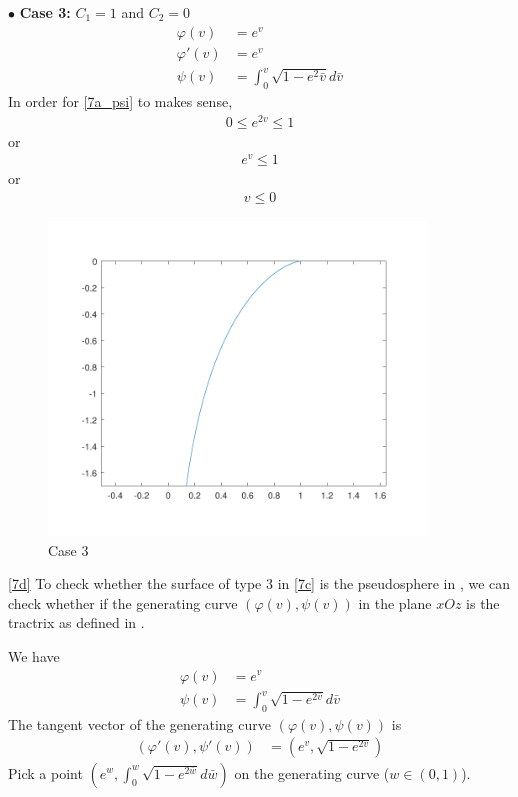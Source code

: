 \documentclass[a4paper]{report}
\begin{document}
$\bullet$ \textbf{Case 3:} $C_1 = 1$ and $C_2 = 0$
\begin{align}
\varphi(v) &= e^{v} \label{7c_phi_c3}\\
\varphi'(v) &= e^{v}\\
\psi(v) &= \int_{0}^{v} \sqrt{1 - e^{2} \bar{v}}d\bar{v}
\end{align}
In order for \eqref{7a_psi} to makes sense,
\begin{align}
0 \leq e^{2v} \leq 1
\end{align}
or
\begin{align}
e^{v} \leq 1
\end{align}
or
\begin{align}
v \leq 0
\end{align}

\begin{figure}[H]
	\centering	\includegraphics[width=10cm]{7c_3}
	\caption{Case 3}
\end{figure}
\newpage
\ref{7d} To check whether the surface of type 3 in \ref{7c} is the pseudosphere in , we can check whether if the generating curve $(\varphi(v), \psi(v))$ in the plane $xOz$ is the tractrix as defined in .

We have
\begin{align}
	\varphi(v) &= e^{v}\\
	\psi(v) &= \int_{0}^{v} \sqrt{1 - e^{2\bar{v} }}d\bar{v} 
\end{align}
The tangent vector of the generating curve $(\varphi(v), \psi(v))$ is
\begin{align}
(\varphi'(v), \psi'(v)) &= \left(e^{v},  \sqrt{1 - e^{2v }}\right)
\end{align}
Pick a point $\left(e^w, \int_{0}^{w} \sqrt{1 - e^{2\bar{w} }}d\bar{w} \right)$ on the generating curve ($w \in (0,1)$).
\end{document}

